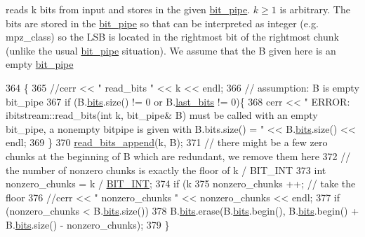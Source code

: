 reads k bits from input and stores in the given \hyperlink{classbit__pipe}{bit\+\_\+pipe}. $k \geq 1$ is arbitrary. The bits are stored in the \hyperlink{classbit__pipe}{bit\+\_\+pipe} so that can be interpreted as integer (e.\+g. mpz\+\_\+class) so the L\+SB is located in the rightmost bit of the rightmost chunk (unlike the usual \hyperlink{classbit__pipe}{bit\+\_\+pipe} situation). We assume that the B given here is an empty \hyperlink{classbit__pipe}{bit\+\_\+pipe} 


\begin{DoxyCode}
364                                             \{
365   \textcolor{comment}{//cerr << " read\_bits " << k << endl;}
366   \textcolor{comment}{// assumption: B is empty bit\_pipe}
367   \textcolor{keywordflow}{if} (B.\hyperlink{classbit__pipe_a86f38af1e9736b053728033490476b50}{bits}.size() != 0 or B.\hyperlink{classbit__pipe_a0f3e84b02751803adaab499b5dad86fe}{last\_bits} != 0)\{
368     cerr << \textcolor{stringliteral}{" ERROR: ibitstream::read\_bits(int k, bit\_pipe& B) must be called with an empty bit\_pipe, a
       nonempty bitpipe is given with B.bits.size() = "} << B.\hyperlink{classbit__pipe_a86f38af1e9736b053728033490476b50}{bits}.size() << endl;
369   \}
370   \hyperlink{classibitstream_acec2e9efa21551ce8db784f5b0bbd1b5}{read\_bits\_append}(k, B);
371   \textcolor{comment}{// there might be a few zero chunks at the beginning of B which are redundant, we remove them here}
372   \textcolor{comment}{// the number of nonzero chunks is exactly the floor of k / BIT\_INT}
373   \textcolor{keywordtype}{int} nonzero\_chunks = k / \hyperlink{bitstream_8h_afcadf5aa65c5159bfb96c4d82ebc0a5d}{BIT\_INT};
374   \textcolor{keywordflow}{if} (k %
375     nonzero\_chunks ++; \textcolor{comment}{// take the floor}
376   \textcolor{comment}{//cerr << " nonzero\_chunks " << nonzero\_chunks << endl;}
377   \textcolor{keywordflow}{if} (nonzero\_chunks < B.\hyperlink{classbit__pipe_a86f38af1e9736b053728033490476b50}{bits}.size())
378     B.\hyperlink{classbit__pipe_a86f38af1e9736b053728033490476b50}{bits}.erase(B.\hyperlink{classbit__pipe_a86f38af1e9736b053728033490476b50}{bits}.begin(), B.\hyperlink{classbit__pipe_a86f38af1e9736b053728033490476b50}{bits}.begin() + B.\hyperlink{classbit__pipe_a86f38af1e9736b053728033490476b50}{bits}.size() - nonzero\_chunks);
379 \}
\end{DoxyCode}
\mbox{\label{classibitstream_acec2e9efa21551ce8db784f5b0bbd1b5}} 
